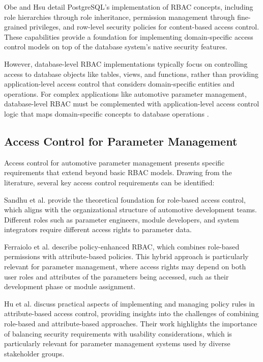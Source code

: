 Obe and Hsu \cite{obe2017postgresql} detail PostgreSQL's implementation of RBAC concepts, including role hierarchies through role inheritance, permission management through fine-grained privileges, and row-level security policies for content-based access control. These capabilities provide a foundation for implementing domain-specific access control models on top of the database system's native security features.

However, database-level RBAC implementations typically focus on controlling access to database objects like tables, views, and functions, rather than providing application-level access control that considers domain-specific entities and operations. For complex applications like automotive parameter management, database-level RBAC must be complemented with application-level access control logic that maps domain-specific concepts to database operations \cite{ferraiolo2011policy}.

\subsection{Access Control for Parameter Management}
\label{subsec:access-control-parameter-management}

Access control for automotive parameter management presents specific requirements that extend beyond basic RBAC models. Drawing from the literature, several key access control requirements can be identified:

Sandhu et al. \cite{sandhu1998role} provide the theoretical foundation for role-based access control, which aligns with the organizational structure of automotive development teams. Different roles such as parameter engineers, module developers, and system integrators require different access rights to parameter data.

Ferraiolo et al. \cite{ferraiolo2011policy} describe policy-enhanced RBAC, which combines role-based permissions with attribute-based policies. This hybrid approach is particularly relevant for parameter management, where access rights may depend on both user roles and attributes of the parameters being accessed, such as their development phase or module assignment.

Hu et al. \cite{hu2015implementing} discuss practical aspects of implementing and managing policy rules in attribute-based access control, providing insights into the challenges of combining role-based and attribute-based approaches. Their work highlights the importance of balancing security requirements with usability considerations, which is particularly relevant for parameter management systems used by diverse stakeholder groups.

